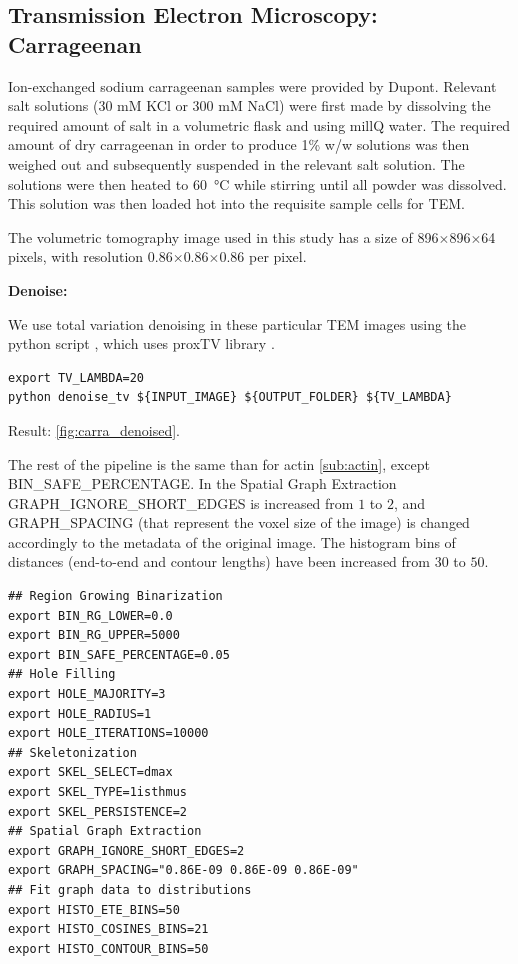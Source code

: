 \subsection{Transmission Electron Microscopy: Carrageenan}%
\label{sub:carrageenan}


Ion-exchanged sodium carrageenan samples were provided by Dupont. Relevant salt solutions (30 mM KCl  or 300 mM NaCl) were first made by dissolving the required amount of salt in a volumetric flask and using millQ water. The required amount of dry carrageenan in order to produce 1\% w/w solutions was then weighed out and subsequently suspended in the relevant salt solution. The solutions were then heated to \SI{60}{\degreeCelsius} while stirring until all powder was dissolved. This solution was then loaded hot into the requisite sample cells for \gls{TEM}.

The volumetric tomography image used in this study has a size of 896$\times$896$\times$64 pixels, with resolution 0.86$\times$0.86$\times$0.86 \nm per pixel.

\textbf{Denoise:}

We use total variation denoising in these particular TEM images using the python script  \cite{phcerdan_denoise_tv_2018}, which uses proxTV library \cite{barbero_modular_2014}.

\begin{verbatim}
export TV_LAMBDA=20
python denoise_tv ${INPUT_IMAGE} ${OUTPUT_FOLDER} ${TV_LAMBDA}
\end{verbatim}

Result: \autoref{fig:carra_denoised}.

The rest of the pipeline is the same than for actin \autoref{sub:actin}, except BIN\_SAFE\_PERCENTAGE.
In the Spatial Graph Extraction GRAPH\_IGNORE\_SHORT\_EDGES is increased from $1$ to $2$,
and GRAPH\_SPACING (that represent the voxel size of the image) is changed accordingly to the metadata of the original image.
The histogram bins of distances (end-to-end and contour lengths) have been increased from $30$ to $50$.

\begin{verbatim}
## Region Growing Binarization
export BIN_RG_LOWER=0.0
export BIN_RG_UPPER=5000
export BIN_SAFE_PERCENTAGE=0.05
## Hole Filling
export HOLE_MAJORITY=3
export HOLE_RADIUS=1
export HOLE_ITERATIONS=10000
## Skeletonization
export SKEL_SELECT=dmax
export SKEL_TYPE=1isthmus
export SKEL_PERSISTENCE=2
## Spatial Graph Extraction
export GRAPH_IGNORE_SHORT_EDGES=2
export GRAPH_SPACING="0.86E-09 0.86E-09 0.86E-09"
## Fit graph data to distributions
export HISTO_ETE_BINS=50
export HISTO_COSINES_BINS=21
export HISTO_CONTOUR_BINS=50
\end{verbatim}

